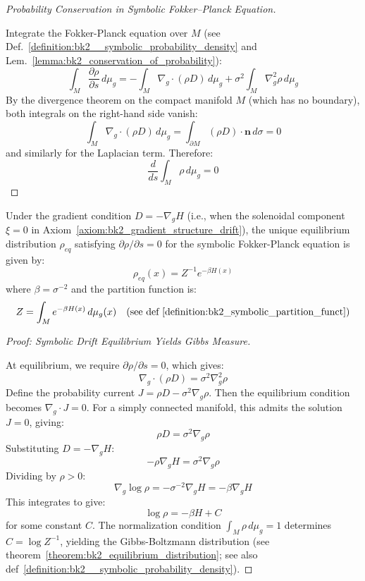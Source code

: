 \begin{proof}[Probability Conservation in Symbolic Fokker–Planck Equation]
\label{proof:bk2_fokker_planck_probability_conservation}
\leavevmode

Integrate the Fokker-Planck equation over $M$
(see Def.~\ref{definition:bk2__symbolic_probability_density} and
Lem.~\ref{lemma:bk2_conservation_of_probability}):
\[
\int_M \frac{\partial \rho}{\partial s} \, d\mu_g 
= -\int_M \nabla_g \cdot (\rho D) \, d\mu_g 
+ \sigma^2 \int_M \nabla_g^2 \rho \, d\mu_g
\]
By the divergence theorem on the compact manifold $M$ (which has no boundary), both integrals on the right-hand side vanish:
\[
\int_M \nabla_g \cdot (\rho D) \, d\mu_g = \int_{\partial M} (\rho D) \cdot \mathbf{n} \, d\sigma = 0
\]
and similarly for the Laplacian term. Therefore:
\[
\frac{d}{ds} \int_M \rho \, d\mu_g = 0
\]
\end{proof}

\begin{theorem} 
\label{theorem:bk2_equilibrium_distribution} 
Under the gradient condition $D = -\nabla_g H$ (i.e., when the solenoidal component $\xi = 0$ in Axiom~\ref{axiom:bk2_gradient_structure_drift}), the unique equilibrium distribution $\rho_{eq}$ satisfying $\partial \rho / \partial s = 0$ for the symbolic Fokker-Planck equation is given by:
\[
\rho_{eq}(x) = Z^{-1} e^{-\beta H(x)}
\]
where $\beta = \sigma^{-2}$ and the partition function is:
\[
Z = \int_M e^{-\beta H(x)} \, d\mu_g(x) \quad \text{(see def~\ref{definition:bk2_symbolic_partition_funct})}
\]
\end{theorem}

\begin{proof}[Proof: Symbolic Drift Equilibrium Yields Gibbs Measure]
\label{proof:bk2_symbolic_drift_equilibrium_yields_gibbs_measure}
\leavevmode

At equilibrium, we require $\partial \rho / \partial s = 0$, which gives:
\[
\nabla_g \cdot (\rho D) = \sigma^2 \nabla_g^2 \rho
\]
Define the probability current $J = \rho D - \sigma^2 \nabla_g \rho$. Then the equilibrium condition becomes $\nabla_g \cdot J = 0$. For a simply connected manifold, this admits the solution $J = 0$, giving:
\[
\rho D = \sigma^2 \nabla_g \rho
\]
Substituting $D = -\nabla_g H$:
\[
-\rho \nabla_g H = \sigma^2 \nabla_g \rho
\]
Dividing by $\rho > 0$:
\[
\nabla_g \log \rho = -\sigma^{-2} \nabla_g H = -\beta \nabla_g H
\]
This integrates to give:
\[
\log \rho = -\beta H + C
\]
for some constant $C$. The normalization condition $\int_M \rho \, d\mu_g = 1$ determines $C = \log Z^{-1}$, yielding the Gibbs-Boltzmann distribution (see theorem~\ref{theorem:bk2_equilibrium_distribution}; see also def~\ref{definition:bk2__symbolic_probability_density}).
\end{proof}


